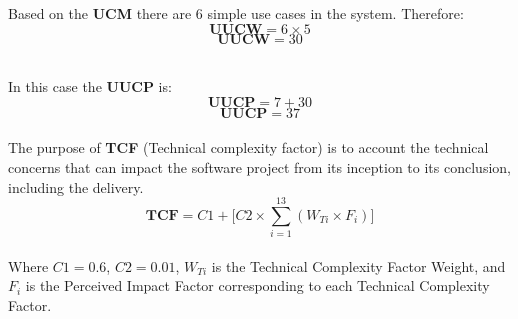 \documentclass[12pt]{article}
\begin{document}
\par Based on the \textbf{UCM} there are 6 simple use cases in the system. Therefore:
\begin{equation}
    \textbf{UUCW} = 6 \times 5
\end{equation}
\begin{equation}
    \textbf{UUCW} = 30
\end{equation}\\

\par In this case the \textbf{UUCP} is:
\begin{equation}
    \textbf{UUCP} = 7 + 30
\end{equation}
\begin{equation}
    \textbf{UUCP} = 37
\end{equation}\\

The purpose of \textbf{TCF} (Technical complexity factor) is to account the technical concerns that can impact the software project from its inception to its conclusion, including the delivery.
\begin{equation}
    \textbf{TCF} = C1 + \Bigg[C2 \times \sum^{13}_{i=1}{(W_{Ti} \times F_{i})\Bigg]} 
\end{equation}\\
Where $C1 = 0.6$, $C2 = 0.01$, $W_{Ti}$ is the Technical Complexity Factor Weight, and $F_{i}$ is the Perceived Impact Factor corresponding to each Technical Complexity Factor. 
\end{document}
